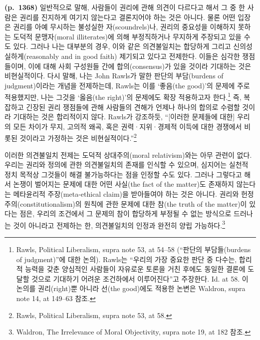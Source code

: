\documentclass[a4paper,12pt,oneside]{article}  %
\begin{document}
\textbf{(p.~1368)} 일반적으로 말해, 사람들이 권리에 관해 의견이 다르다고
해서 그 중 한 사람은 권리를 진지하게 여기지 않는다고 결론지어야 하는
것은 아니다. 물론 어떤 입장은 권리를 아예 무시하는 불성실한
자(scoundrels)나, 권리의 중요성을 이해하지 못하는 도덕적 문맹자(moral
illiterates)에 의해 부정직하거나 무지하게 주장되고 있을 수도 있다.
그러나 나는 대부분의 경우, 이와 같은 의견불일치는 합당하게 그리고
신의성실하게(reasonably and in good faith) 제기되고 있다고 전제한다.
이들은 심각한 쟁점들이며, 이에 대해 사회 구성원들 간에 합의(consensus)가
있을 것이라 기대하는 것은 비현실적이다. 다시 말해, 나는 John Rawls가
말한 판단의 부담(burdens of judgment)이라는 개념을 전제하는데, Rawls는
이를 `좋음(the good)'의 문제에 주로 적용했지만, 나는 그것을 `옳음(the
right)'의 문제에도 확장 적용하고자 한다.\footnote{Rawls, Political
  Liberalism, supra note 53, at 54--58 (``판단의 부담들(burdens of
  judgment)''에 대한 논의). Rawls는 ``우리의 가장 중요한 판단 중 다수는,
  합리적 능력을 갖춘 양심적인 사람들이 자유로운 토론을 거친 후에도
  동일한 결론에 도달할 것으로 기대하기 어려운 조건하에서 이루어진다''고
  주장한다. Id. at 58. 이 논의를 권리(right)뿐 아니라 선(the good)에도
  적용한 논변은 Waldron, supra note 14, at 149--63 참조.} 즉, 복잡하고
긴장된 권리 쟁점들에 관해 사람들의 견해가 언제나 하나의 합의로 수렴할
것이라 기대하는 것은 합리적이지 않다. Rawls가 강조하듯, ``{[}이러한
문제들에 대한{]} 우리의 모든 차이가 무지, 고의적 왜곡, 혹은
권력·지위·경제적 이득에 대한 경쟁에서 비롯된 것이라고 가정하는 것은
비현실적이다.''\footnote{Rawls, Political Liberalism, supra note 53, at
  58.}

이러한 의견불일치 전제는 도덕적 상대주의(moral relativism)와는 아무
관련이 없다. 우리는 권리와 정의에 관한 의견불일치의 존재를 인식할 수
있으며, 심지어는 실천적 정치 목적상 그것들이 해결 불가능하다는 점을
인정할 수도 있다. 그러나 그렇다고 해서 논쟁이 벌어지는 문제에 대한 어떤
사실(the fact of the matter)도 존재하지 않는다는 메타윤리적
주장(meta-ethical claim)을 받아들여야 하는 것은 아니다. 권리와
헌정주의(constitutionalism)의 원칙에 관한 문제에 대한 참(the truth of
the matter)이 있다는 점은, 우리의 조건에서 그 문제의 참이 합당하게
부정될 수 없는 방식으로 드러나는 것이 아니라고 전제하는 한, 의견불일치의
인정과 완전히 양립 가능하다.\footnote{Waldron, The Irrelevance of Moral
  Objectivity, supra note 19, at 182 참조.}
\end{document}
